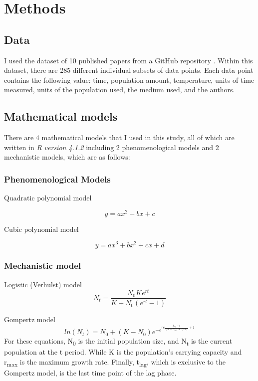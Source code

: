 \documentclass[11pt]{article}
\begin{document}
   \section{Methods}

  \subsection*{Data}
  I used the dataset of 10 published papers from a GitHub repository \cite{mhasoba_multilingual_2022}. 
  Within this dataset, there are 285 different individual subsets of data points.
  Each data point contains the following value: time, population amount, temperature, units of time measured, units of the population used, the medium used, and the authors. 

  \subsection*{Mathematical models}
  There are 4 mathematical models that I used in this study, all of which are written in \textit{R version 4.1.2} including 2 phenomenological models and 2 mechanistic models, which are as follows:  
  \subsubsection*{Phenomenological Models}
  \noindent Quadratic polynomial model

    \begin{equation}
        y = ax^{2} + bx + c
    \end{equation}

    \noindent Cubic polynomial model
    
    \begin{equation}
        y = ax^{3} + bx^{2} + cx + d
    \end{equation}

  \subsubsection*{Mechanistic model}

  \noindent Logistic (Verhulst) model \cite{peleg2011microbial}
    \begin{equation}
        N_t = \frac{N_0Ke^{rt}}{K + N_0(e^{rt} - 1)}
    \end{equation}

  \noindent Gompertz model \cite{zwietering1990modeling}
    \begin{equation}
        ln(N_t) = N_0 + (K - N_0)e^{-e^{re\frac{t_{lag} - t}{(K - N_0)\ln(10)} + 1}}
    \end{equation}
    For these equations, N\textsubscript{0} is the initial population size, and N\textsubscript{t} is the current population at the t period. While K is the population's carrying capacity and r\textsubscript{max} is the maximum growth rate. Finally, t\textsubscript{lag}, which is exclusive to the Gompertz model, is the last time point of the lag phase.
  
\end{document}
